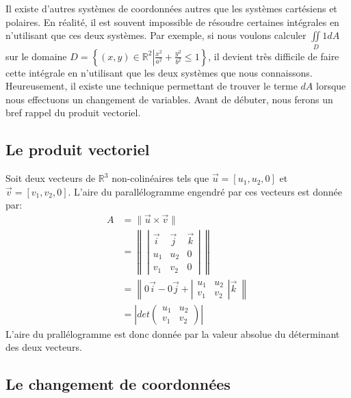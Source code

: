 \documentclass[]{book}
\theoremstyle{definition}
\theoremstyle{definition}
\theoremstyle{definition}
\theoremstyle{remark}
\begin{document}
Il existe d'autres systèmes de coordonnées autres que les systèmes
cartésiens et polaires. En réalité, il est souvent impossible de
résoudre certaines intégrales en n'utilisant que ces deux systèmes. Par
exemple, si nous voulons calculer \(\iint\limits_D 1 dA\) sur le domaine
\(D=\left\{(x,y)\in\mathbb{R}^2\left| \frac{x^2}{a^2}+\frac{y^2}{b^2}\leq 1 \right. \right\}\),
il devient très difficile de faire cette intégrale en n'utilisant que
les deux systèmes que nous connaissons. Heureusement, il existe une
technique permettant de trouver le terme \(dA\) lorsque nous effectuons
un changement de variables. Avant de débuter, nous ferons un bref rappel
du produit vectoriel.

\hypertarget{le-produit-vectoriel}{%
\subsection{Le produit vectoriel}\label{le-produit-vectoriel}}

Soit deux vecteurs de \(\mathbb{R}^3\) non-colinéaires tels que
\(\overrightarrow{u}=[u_1,u_2,0]\) et
\(\overrightarrow{v}=[v_1,v_2,0]\). L'aire du parallélogramme engendré
par ces vecteurs est donnée par: \begin{align*}
A&= \| \vec u \times \vec v\| \\
&= \left\| \ \left| \begin{array}{ccc}
\vec i &\vec j& \vec k\\
u_1 & u_2 &0 \\
v_1 & v_2 &0
\end{array}
\right|\ \right\| \\
 &=\left\|   0\vec i - 0\vec j+\left|
\begin{array}{cc}
u_1 & u_2  \\
v_1 & v_2 
\end{array}  
\right|\vec k \ \right\| \\
&= \left| det  \left(\begin{array}{cc}
u_1 & u_2  \\
v_1 & v_2 
\end{array}  \right) \right|
\end{align*} L'aire du prallélogramme est donc donnée par la valeur
absolue du déterminant des deux vecteurs.

\hypertarget{le-changement-de-coordonnees}{%
\subsection{Le changement de
coordonnées}\label{le-changement-de-coordonnees}}
\end{document}
